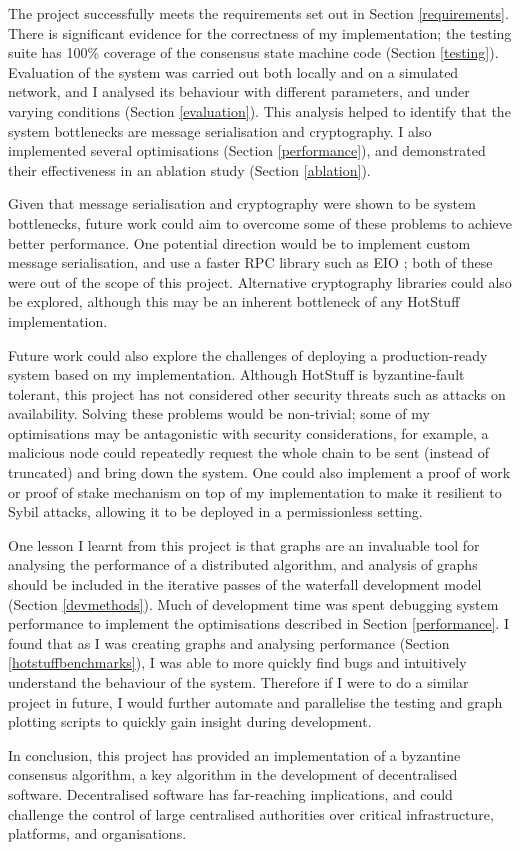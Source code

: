The project successfully meets the requirements set out in Section \ref{requirements}. There is significant evidence for the correctness of my implementation; the testing suite has 100\% coverage of the consensus state machine code (Section \ref{testing}). Evaluation of the system was carried out both locally and on a simulated network, and I analysed its behaviour with different parameters, and under varying conditions (Section \ref{evaluation}). This analysis helped to identify that the system bottlenecks are message serialisation and cryptography. I also implemented several optimisations (Section \ref{performance}), and demonstrated their effectiveness in an ablation study (Section \ref{ablation}).

Given that message serialisation and cryptography were shown to be system bottlenecks, future work could aim to overcome some of these problems to achieve better performance. One potential direction would be to implement custom message serialisation, and use a faster RPC library such as EIO \cite{eio}; both of these were out of the scope of this project. Alternative cryptography libraries could also be explored, although this may be an inherent bottleneck of any HotStuff implementation.

Future work could also explore the challenges of deploying a production-ready system based on my implementation. Although HotStuff is byzantine-fault tolerant, this project has not considered other security threats such as attacks on availability. Solving these problems would be non-trivial; some of my optimisations may be antagonistic with security considerations, for example, a malicious node could repeatedly request the whole chain to be sent (instead of truncated) and bring down the system. One could also implement a proof of work or proof of stake mechanism on top of my implementation to make it resilient to Sybil attacks, allowing it to be deployed in a permissionless setting.

One lesson I learnt from this project is that graphs are an invaluable tool for analysing the performance of a distributed algorithm, and analysis of graphs should be included in the iterative passes of the waterfall development model (Section \ref{devmethods}). Much of development time was spent debugging system performance to implement the optimisations described in Section \ref{performance}. I found that as I was creating graphs and analysing performance (Section \ref{hotstuffbenchmarks}), I was able to more quickly find bugs and intuitively understand the behaviour of the system. Therefore if I were to do a similar project in future, I would further automate and parallelise the testing and graph plotting scripts to quickly gain insight during development.

In conclusion, this project has provided an implementation of a byzantine consensus algorithm, a key algorithm in the development of decentralised software. Decentralised software has far-reaching implications, and could challenge the control of large centralised authorities over critical infrastructure, platforms, and organisations.
